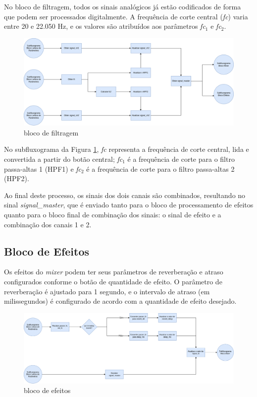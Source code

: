 No bloco de filtragem, todos os sinais analógicos já estão codificados de forma que podem ser processados digitalmente. A frequência de corte central (\textit{fc}) varia entre 20 e 22.050 Hz, e os valores são atribuídos aos parâmetros \textit{fc$_{1}$} e \textit{fc$_{2}$}.

\begin{figure}[h]
    \centering
    \includegraphics[width=\textwidth]{figuras/fig55.png}
    \caption{bloco de filtragem}
    \label{fig55}
\end{figure}

No subfluxograma da Figura \ref{fig55}, \textit{fc} representa a frequência de corte central, lida e convertida a partir do botão central; \textit{fc$_{1}$} é a frequência de corte para o filtro passa-altas 1 (HPF1) e \textit{fc$_{2}$} é a frequência de corte para o filtro passa-altas 2 (HPF2).

Ao final deste processo, os sinais dos dois canais são combinados, resultando no sinal \textit{signal\_master}, que é enviado tanto para o bloco de processamento de efeitos quanto para o bloco final de combinação dos sinais: o sinal de efeito e a combinação dos canais 1 e 2.

\subsection{Bloco de Efeitos}

Os efeitos do \textit{mixer} podem ter seus parâmetros de reverberação e atraso configurados conforme o botão de quantidade de efeito. O parâmetro de reverberação é ajustado para 1 segundo, e o intervalo de atraso (em milissegundos) é configurado de acordo com a quantidade de efeito desejado.

\begin{figure}[h]
    \centering
    \includegraphics[width=\textwidth]{figuras/fig56.png}
    \caption{bloco de efeitos}
    \label{fig56}
\end{figure}

